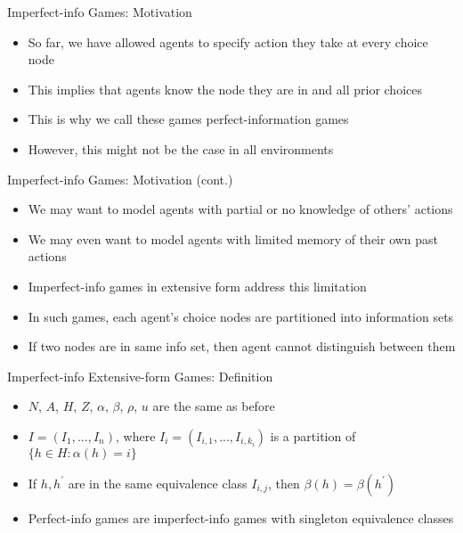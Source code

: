 \documentclass[11pt,aspectratio=169]{beamer}
\begin{document}
  \begin{frame}{Imperfect-info Games: Motivation}
   \begin{itemize}[<+->]
   \setlength{\itemsep}{1.2em}
    \item So far, we have allowed agents to specify action they take at every choice node
    \item This implies that agents know the node they are in and all prior choices
    \item This is why we call these games \alert{perfect-information} games
    \item However, this might not be the case in all environments
   \end{itemize}
  \end{frame}
  
    \begin{frame}{Imperfect-info Games: Motivation (cont.)}
   \begin{itemize}[<+->]
   \setlength{\itemsep}{1.2em}
    \item We may want to model agents with \alert{partial or no knowledge} of others' actions
    \item We may even want to model agents with \alert{limited memory} of their \alert{own} past actions
    \item \alert{Imperfect-info} games in extensive form address this limitation
    \item In such games, each agent's choice nodes are partitioned into \alert{information sets}
    \item If two nodes are in same info set, then agent cannot distinguish between them
   \end{itemize}
  \end{frame}
 
  \begin{frame}{Imperfect-info Extensive-form Games: Definition}
   \begin{itemize}
   \setlength{\itemsep}{1.5em}
    \item $N$, $A$, $H$, $Z$, $\alpha$, $\beta$, $\rho$, $u$ are the same as before
    \item $I = (I_1,...,I_n)$, where $I_i = (I_{i,1},...,I_{i,k_i})$ is a partition of $\{h \in H : \alpha(h) = i\}$
    \item If $h, h^\prime$ are in the same \alert{equivalence class} $I_{i,j}$, then $\beta(h) = \beta(h^\prime)$
    \item Perfect-info games are imperfect-info games with singleton equivalence classes
   \end{itemize}
  \end{frame}
\end{document}

